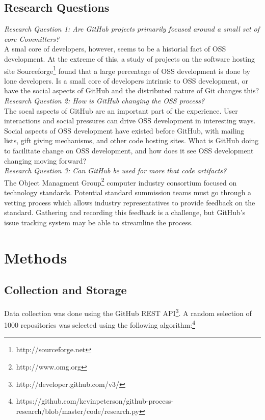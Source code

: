\documentclass{proc}
\begin{document}
\subsection{Research Questions}

\emph{Research Question 1: Are GitHub projects primarily focused around a small set of core Committers?}\\
A smal core of developers, however, seems to be a historial fact of OSS development\cite{mockus2000case,mockus2002two,krishnamurthy2002cave}. At the extreme of this, a study of projects on the software hosting site Sourceforge\footnote{http://sourceforge.net} found that a large percentage of OSS development is done by lone developers. Is a small core of developers intrinsic to OSS development, or have the social aspects of GitHub and the distributed nature of Git changes this?\\

\emph{Research Question 2: How is GitHub changing the OSS process?}\\
The socal aspects of GitHub are an important part of the experience\cite{dabbish2012social}. User interactions and social pressures can drive OSS development in interesting ways. Social aspects of OSS development have existed before GitHub, with mailing lists\cite{mockus2000case}, gift giving mechanisms\cite{bergquist2008power}, and other code hosting sites. What is GitHub doing to facilitate change on OSS development, and how does it see OSS development changing moving forward?\\

\emph{Research Question 3: Can GitHub be used for more that code artifacts?}\\
The Object Managment Group\textregistered\footnote{http://www.omg.org} computer industry consortium focused on technology standards. Potential standard summission teams must go through a vetting process\cite{kobryn1999uml} which allows industry representatives to provide feedback on the standard. Gathering and recording this feedback is a challenge, but GitHub's issue tracking system may be able to streamline the process.

\section{Methods}
\subsection{Collection and Storage}
Data collection was done using the GitHub REST API\footnote{http://developer.github.com/v3/}. A random selection of 1000 repositories was selected using the following algorithm:\footnote{https://github.com/kevinpeterson/github-process-research/blob/master/code/research.py}
\end{document}
